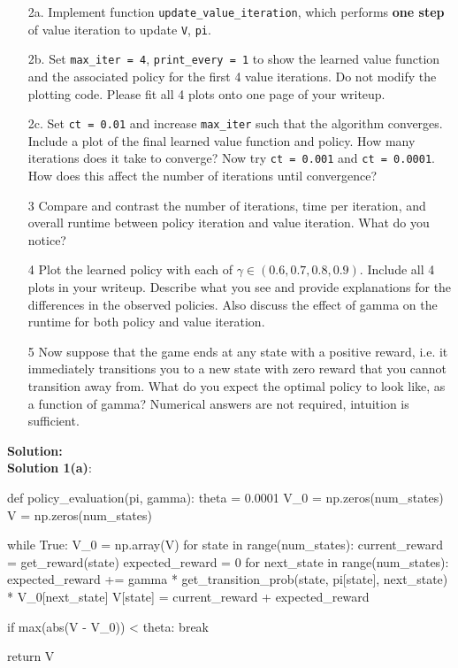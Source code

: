 \documentclass[submit]{harvardml}
\begin{document}
\begin{framed}
\begin{itemize}
    \item [2a.] Implement function
      \texttt{update\_value\_iteration}, which performs \textbf{one step} of value iteration to update \texttt{V}, \texttt{pi}.
      
    \item [2b.] Set \texttt{max\_iter = 4}, \texttt{print\_every = 1} to show the learned value function and the associated policy for the first 4 value iterations. Do not modify the plotting code. Please fit all 4 plots onto one page of your writeup.
    
    \item [2c.] Set \texttt{ct = 0.01} and increase \texttt{max\_iter} such that the algorithm converges. Include a plot of the final learned value function and policy. How many iterations does it take to converge? Now try \texttt{ct = 0.001} and \texttt{ct = 0.0001}. How does this affect the number of iterations until convergence?
    
    \item[3] Compare and contrast the number of iterations, time per iteration, and overall runtime between policy iteration and value iteration. What do you notice?
    
    \item[4] Plot the learned policy with each of $\gamma \in (0.6,0.7,0.8,0.9)$. Include all 4 plots in your writeup. Describe what you see and provide explanations for the differences in the observed policies. Also discuss the effect of gamma on the runtime for both policy and value iteration.
    
    \item[5] Now suppose that the game ends at any state with a positive reward, i.e. it immediately transitions you to a new state with zero reward that you cannot transition away from. What do you expect the optimal policy to look like, as a function of gamma? Numerical answers are not required, intuition is sufficient.
 
\end{itemize}
\end{framed}

\newpage
\textbf{Solution:}\\
\textbf{Solution 1(a)}:\\
\begin{python}
    def policy_evaluation(pi, gamma):
    theta = 0.0001
    V_0 = np.zeros(num_states)
    V = np.zeros(num_states)
    
    while True:
        V_0 = np.array(V)
        for state in range(num_states):
            current_reward = get_reward(state)
            expected_reward = 0
            for next_state in range(num_states):
                expected_reward += gamma * get_transition_prob(state, pi[state], next_state) * V_0[next_state]
            V[state] = current_reward + expected_reward

        if max(abs(V - V_0)) < theta:
            break

    return V
\end{python}
\end{document}
